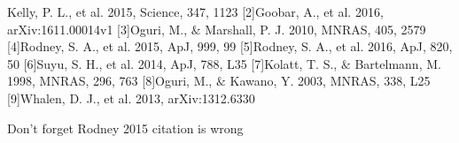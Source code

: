 \noindent\fontsize{10}{14}\selectfont
[1]Kelly, P. L., et al. 2015, Science, 347, 1123 [2]Goobar, A., et
al. 2016, arXiv:1611.00014v1 [3]Oguri, M., $\&$ Marshall, P. J. 2010,
MNRAS, 405, 2579 [4]Rodney, S. A., et al. 2015, ApJ, 999, 99
[5]Rodney, S. A., et al. 2016, ApJ, 820, 50 [6]Suyu, S. H., et
al. 2014, ApJ, 788, L35 [7]Kolatt, T. S., $\&$ Bartelmann, M. 1998,
MNRAS, 296, 763 [8]Oguri, M., $\&$ Kawano, Y. 2003, MNRAS, 338, L25
[9]Whalen, D. J., et al. 2013, arXiv:1312.6330


\pagebreak

\noindent\fontsize{20}{14}\selectfont
Don't forget Rodney 2015 citation is wrong
\noindent\fontsize{10}{14}\selectfont
